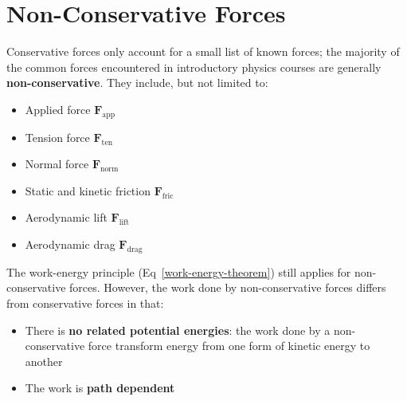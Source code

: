 %
%


\section{Non-Conservative Forces}
Conservative forces only account for a small list of known forces; the majority
of the common forces encountered in introductory physics courses are generally
\textbf{non-conservative}. They include, but not limited to:
\begin{itemize}[itemsep=6pt]
\item Applied force $\bm F_\text{app}$
\item Tension force $\bm F_\text{ten}$
\item Normal force $\bm F_\text{norm}$
\item Static and kinetic friction $\bm F_\text{fric}$
\item Aerodynamic lift $\bm F_\text{lift}$
\item Aerodynamic drag $\bm F_\text{drag}$
\end{itemize}
The work-energy principle (Eq~\ref{work-energy-theorem}) still applies for
non-conservative forces. However, the work done by non-conservative forces
differs from conservative forces in that:
\begin{itemize}[itemsep=6pt]
\item There is \textbf{no related potential energies}: the work done by a
  non-conservative force transform energy from one form of kinetic energy to
  another
\item The work is \textbf{path dependent}
\end{itemize}



